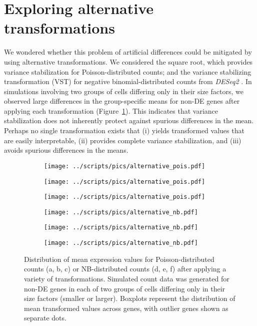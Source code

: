\documentclass[10pt,letterpaper]{article}
\begin{document}
\section{Exploring alternative transformations}
We wondered whether this problem of artificial differences could be mitigated by using alternative transformations.
We considered the square root, which provides variance stabilization for Poisson-distributed counts;
and the variance stabilizing transformation (VST) for negative binomial-distributed counts from \emph{DESeq2} \cite{love2014moderated}.
In simulations involving two groups of cells differing only in their size factors, we observed large differences in the group-specific means for non-DE genes after applying each transformation (Figure~\ref{fig:alttransform}).
This indicates that variance stabilization does not inherently protect against spurious differences in the mean.
Perhaps no single transformation exists that 
(i) yields transformed values that are easily interpretable,
(ii) provides complete variance stabilization, and
(iii) avoids spurious differences in the means.

\begin{figure}
\centering
\begin{subfigure}[b]{0.32\textwidth}
    \texttt{[image: ../scripts/pics/alternative\_pois.pdf]}
    \caption{}
\end{subfigure}
\begin{subfigure}[b]{0.32\textwidth}
    \texttt{[image: ../scripts/pics/alternative\_pois.pdf]}
    \caption{}
\end{subfigure}
\begin{subfigure}[b]{0.32\textwidth}
    \texttt{[image: ../scripts/pics/alternative\_pois.pdf]}
    \caption{}
\end{subfigure}
\begin{subfigure}[b]{0.32\textwidth}
    \texttt{[image: ../scripts/pics/alternative\_nb.pdf]}
    \caption{}
\end{subfigure}
\begin{subfigure}[b]{0.32\textwidth}
    \texttt{[image: ../scripts/pics/alternative\_nb.pdf]}
    \caption{}
\end{subfigure}
\begin{subfigure}[b]{0.32\textwidth}
    \texttt{[image: ../scripts/pics/alternative\_nb.pdf]}
    \caption{}
\end{subfigure}
\caption{Distribution of mean expression values for Poisson-distributed counts (a, b, c) or NB-distributed counts (d, e, f) after applying a variety of transformations.
Simulated count data was generated for non-DE genes in each of two groups of cells differing only in their size factors (smaller or larger).    
Boxplots represent the distribution of mean transformed values across genes, with outlier genes shown as separate dots.
}
\label{fig:alttransform}
\end{figure}
\end{document}
